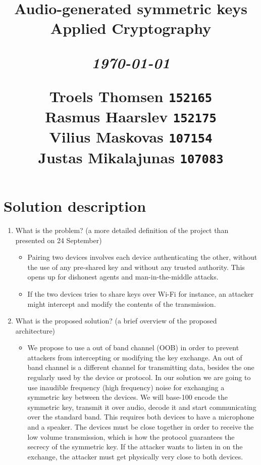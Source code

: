 \documentclass[12pt]{article}
\title{
  \vspace{4cm}
  \begin{flushleft}
  \Large{\textbf{Audio-generated symmetric keys}} \\
  \large{Applied Cryptography}
  \end{flushleft}
  \vspace{0cm}
  \begin{flushleft}
  \small
  \textit{\today}
  \end{flushleft}
  \vspace{12cm}
  \begin{flushleft}
  \small
  Troels Thomsen \texttt{152165} \\
  Rasmus Haarslev \texttt{152175} \\
  Vilius Maskovas \texttt{107154} \\
  Justas Mikalajunas \texttt{107083}\\
  \end{flushleft}
}
\date{
}
\begin{document}
\clearpage
{}
\thispagestyle{empty}
\maketitle

\newpage


\section{Solution description}
\label{sec:Solution description}

\begin{enumerate}
    \item What is the problem?  (a more detailed definition of the project than presented on 24 September)

    \begin{itemize}
        \item Pairing two devices involves each device authenticating the other, without the use of any pre-shared key and without any trusted authority. This opens up for dishonest agents and man-in-the-middle attacks.
        \item If the two devices tries to share keys over Wi-Fi for instance, an attacker might intercept and modify the contents of the transmission.
    \end{itemize}

    \item What is the proposed solution? (a brief overview of the proposed architecture)

    \begin{itemize}
        \item We propose to use a out of band channel (OOB) in order to prevent attackers from intercepting or modifying the key exchange. An out of band channel is a different channel for transmitting data, besides the one regularly used by the device or protocol. In our solution we are going to use inaudible frequency (high frequency) noise for exchanging a symmetric key between the devices.
        We will base-100 encode the symmetric key, transmit it over audio, decode it and start communicating over the standard band.
        This requires both devices to have a microphone and a speaker.
        The devices must be close together in order to receive the low volume transmission, which is how the protocol guarantees the secrecy of the symmetric key. If the attacker wants to listen in on the exchange, the attacker must get physically very close to both devices.
    \end{itemize}


\end{enumerate}
\end{document}
